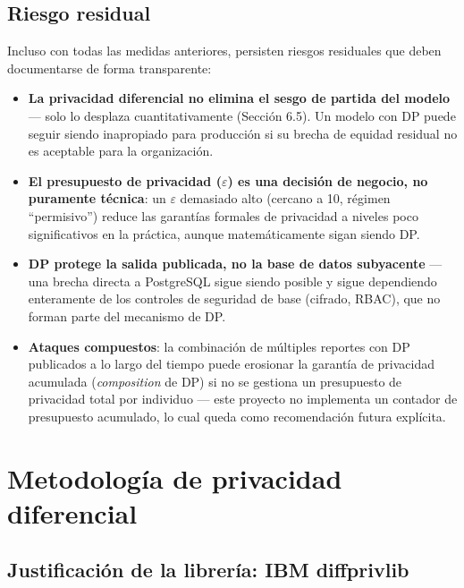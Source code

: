 \documentclass[11pt,a4paper]{article}
\newcommand{\eps}{\ensuremath{\varepsilon}}
\begin{document}
\subsection{Riesgo residual}

Incluso con todas las medidas anteriores, persisten riesgos residuales que deben documentarse de
forma transparente:

\begin{itemize}[leftmargin=1.4em]
\item \textbf{La privacidad diferencial no elimina el sesgo de partida del modelo} --- solo lo
desplaza cuantitativamente (Sección 6.5). Un modelo con DP puede seguir siendo inapropiado para
producción si su brecha de equidad residual no es aceptable para la organización.
\item \textbf{El presupuesto de privacidad (\eps) es una decisión de negocio, no puramente
técnica}: un \eps{} demasiado alto (cercano a 10, régimen ``permisivo'') reduce las garantías
formales de privacidad a niveles poco significativos en la práctica, aunque matemáticamente sigan
siendo DP.
\item \textbf{DP protege la salida publicada, no la base de datos subyacente} --- una brecha
directa a PostgreSQL sigue siendo posible y sigue dependiendo enteramente de los controles de
seguridad de base (cifrado, RBAC), que no forman parte del mecanismo de DP.
\item \textbf{Ataques compuestos}: la combinación de múltiples reportes con DP publicados a lo
largo del tiempo puede erosionar la garantía de privacidad acumulada (\emph{composition} de DP) si
no se gestiona un presupuesto de privacidad total por individuo --- este proyecto no implementa un
contador de presupuesto acumulado, lo cual queda como recomendación futura explícita.
\end{itemize}

\section{Metodología de privacidad diferencial}

\subsection{Justificación de la librería: IBM diffprivlib}
\end{document}
